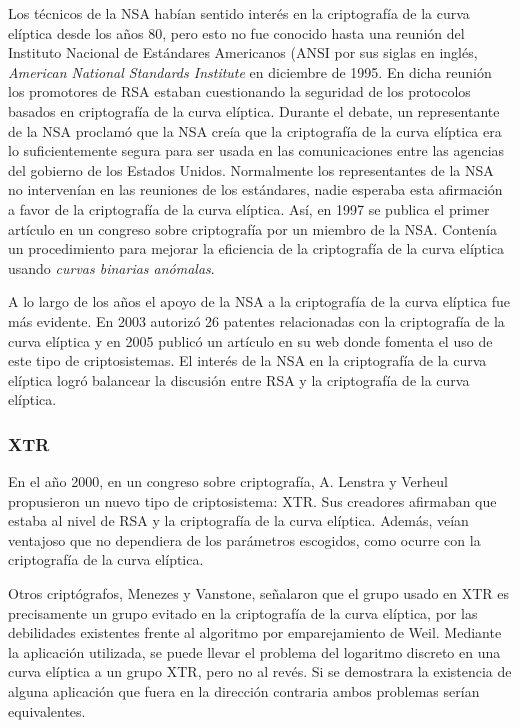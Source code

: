 \documentclass[
  a4paper,
  12pt,
  spanish,
]{scrartcl}
\begin{document}
Los técnicos de la NSA habían sentido interés en la criptografía de la curva elíptica desde los años 80, pero esto no fue conocido hasta una reunión del Instituto Nacional de Estándares Americanos (ANSI por sus siglas en inglés, \textit{American National Standards Institute} en diciembre de 1995. En dicha reunión los promotores de RSA estaban cuestionando la seguridad de los protocolos basados en criptografía de la curva elíptica. Durante el debate, un representante de la NSA proclamó que la NSA creía que la criptografía de la curva elíptica era lo suficientemente segura para ser usada en las comunicaciones entre las agencias del gobierno de los Estados Unidos. Normalmente los representantes de la NSA no intervenían en las reuniones de los estándares, nadie esperaba esta afirmación a favor de la criptografía de la curva elíptica. Así, en 1997 se publica el primer artículo en un congreso sobre criptografía por un miembro de la NSA. Contenía un procedimiento para mejorar la eficiencia de la criptografía de la curva elíptica usando \textit{curvas binarias anómalas}.

A lo largo de los años el apoyo de la NSA a la criptografía de la curva elíptica fue más evidente. En 2003 autorizó 26 patentes relacionadas con la criptografía de la curva elíptica y en 2005 publicó un artículo en su web donde fomenta el uso de este tipo de criptosistemas. El interés de la NSA en la criptografía de la curva elíptica logró balancear la discusión entre RSA y la criptografía de la curva elíptica.

\subsubsection{XTR}

En el año 2000, en un congreso sobre criptografía, A. Lenstra y Verheul propusieron un nuevo tipo de criptosistema: XTR. Sus creadores afirmaban que estaba al nivel de RSA y la criptografía de la curva elíptica. Además, veían ventajoso que no dependiera de los parámetros escogidos, como ocurre con la criptografía de la curva elíptica.

Otros criptógrafos, Menezes y Vanstone, señalaron que el grupo usado en XTR es precisamente un grupo evitado en la criptografía de la curva elíptica, por las debilidades existentes frente al algoritmo por emparejamiento de Weil. Mediante la aplicación utilizada, se puede llevar el problema del logaritmo discreto en una curva elíptica a un grupo XTR, pero no al revés. Si se demostrara la existencia de alguna aplicación que fuera en la dirección contraria ambos problemas serían equivalentes.
\end{document}
